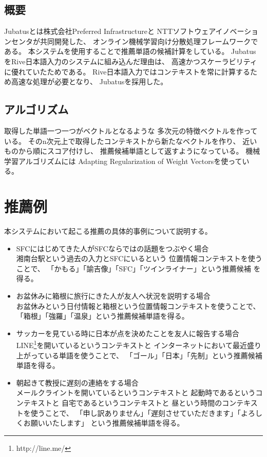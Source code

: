 \subsection{概要}
Jubatus\cite{jubatus}とは株式会社Preferred Infrastructureと
NTTソフトウェアイノベーションセンタが共同開発した、
オンライン機械学習向け分散処理フレームワークである。
本システムを使用することで推薦単語の候補計算をしている。
JubatusをRive日本語入力のシステムに組み込んだ理由は、
高速かつスケーラビリティに優れていたためである。
\cite{岡野原大輔:2013-01-01}
Rive日本語入力ではコンテキストを常に計算するため高速な処理が必要となり、
Jubatusを採用した。

\subsection{アルゴリズム}
取得した単語一つ一つがベクトルとなるような
多次元の特徴ベクトルを作っている。
そのn次元上で取得したコンテキストから新たなベクトルを作り、
近いものから順にスコア付けし、
推薦候補単語として返すようになっている。
機械学習アルゴリズムには
Adapting Regularization of Weight Vectors\cite{AROW}を使っている。

\section{推薦例}
本システムにおいて起こる推薦の具体的事例について説明する。
\begin{itemize}
  \item SFCにはじめてきた人がSFCならではの話題をつぶやく場合\mbox{}\\
    湘南台駅という過去の入力とSFCにいるという
    位置情報コンテキストを使うことで、
    「かもる」「諭吉像」「SFC」「ツインライナー」という推薦候補
    を得る。
  \item お盆休みに箱根に旅行にきた人が友人へ状況を説明する場合\mbox{}\\
    お盆休みという日付情報と箱根という位置情報コンテキストを使うことで、
    「箱根」「強羅」「温泉」という推薦候補単語を得る。
  \item サッカーを見ている時に日本が点を決めたことを友人に報告する場合\mbox{}\\
    LINE\footnote{http://line.me/}を開いているというコンテキストと
    インターネットにおいて最近盛り上がっている単語を使うことで、
    「ゴール」「日本」「先制」という推薦候補単語を得る。
  \item 朝起きて教授に遅刻の連絡をする場合\mbox{}\\
    メールクライントを開いているというコンテキストと
    起動時であるというコンテキストと
    自宅であるというコンテキストと
    昼という時間のコンテキストを使うことで、
    「申し訳ありません」「遅刻させていただきます」「よろしくお願いいたします」
    という推薦候補単語を得る。
\end{itemize}
